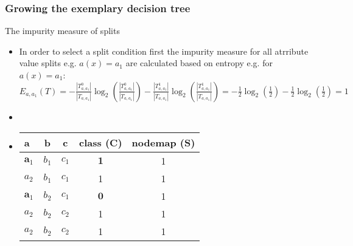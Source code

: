 \documentclass[smaller, proffesionalfonts]{beamer}
\def\bm{\boldsymbol}
\begin{document}
\begin{frame}
\frametitle{Growing the exemplary decision tree}
\begin{block}{The impurity measure of splits}
\begin{itemize}
\item
In order to select a split condition first the impurity measure for all atrribute value splits e.g. $a(x)=a_1$ are calculated based on entropy e.g. for $a(x)=a_1$:
$E_{a,a_1}(T)= 
-\frac{|T^{0}_{a,a_1}|}{|T_{a,a_1}|}\log_2(\frac{|T^{0}_{a,a_1}|}{|T_{a,a_1}|}) 
-\frac{|T^{1}_{a,a_1}|}{|T_{a,a_1}|}\log_2(\frac{|T^{1}_{a,a_1}|}{|T_{a,a_1}|}) =
-\frac{1}{2}\log_2(\frac{1}{2})-\frac{1}{2}\log_2(\frac{1}{2})=1$
\item 
\item
\begin{center}
{\sf
   \begin{tabular}{|p{3mm}||c|c||c||c|}
   \hline 
   a & b & c & class (C) & nodemap (S)\\
   \hline
   \hline
    $\bm a_1$ & $b_1$ & $c_1$ & $\bm 1$ & 1 \\
   \hline
    $a_2$ & $b_1$ & $c_1$ & 1 & 1 \\
   \hline
    $\bm a_1$ & $b_2$ & $c_1$ & $\bm 0$ & 1 \\
   \hline
    $a_2$ & $b_2$ & $c_2$ & 1 & 1 \\
   \hline
    $a_2$ & $b_2$ & $c_2$ & 1 & 1 \\
   \hline
   \end{tabular}
}
\end{center}
\end{itemize}
\end{block}
\end{frame}
\end{document}

